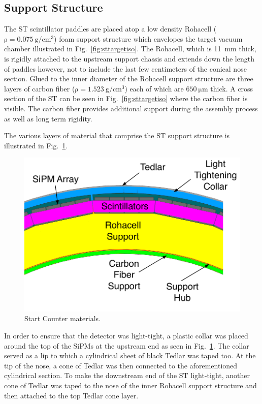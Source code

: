 \subsection{Support Structure} \label{sec:design_support}

The ST scintillator paddles are placed atop a low density Rohacell ($\mathrm{\rho = 0.075\ g/cm^{3}}$) foam support structure which envelopes the target vacuum chamber illustrated in Fig.~\ref{fig:sttargetiso}.
The Rohacell, which is 11~mm thick, is rigidly attached to the upstream support chassis and extends down the length of paddles however, not to include the last few centimeters of the conical nose section.  Glued to the inner diameter of the Rohacell support structure are three layers of carbon fiber ($\mathrm{\rho = 1.523\ g/cm^{3}}$) each of which are $\mathrm{650\ \mu m}$ thick.  A cross section of the ST can be seen in Fig.~\ref{fig:sttargetiso} where the carbon fiber is visible.  The carbon fiber provides additional support during the assembly process as well as long term rigidity.  

The various layers of material that comprise the ST support structure is illustrated in Fig.~\ref{fig:stmaterials}.
	\begin{figure}[!htb]
		\centering
		\includegraphics[width=1.0\columnwidth]{design/figs/st_materials_v2}
		\caption{Start Counter materials.}
		\label{fig:stmaterials}
	\end{figure}
In order to ensure that the detector was light-tight, a plastic collar was placed around the top of the SiPMs at the upstream end as seen in Fig.~\ref{fig:stmaterials}.  The collar served as a lip to which a cylindrical sheet of black Tedlar was taped too.  At the tip of the nose, a cone of Tedlar was then connected to the aforementioned cylindrical section.  To make the downstream end of the ST light-tight, another cone of Tedlar was taped to the nose of the inner Rohacell support structure and then attached to the top Tedlar cone layer. 


